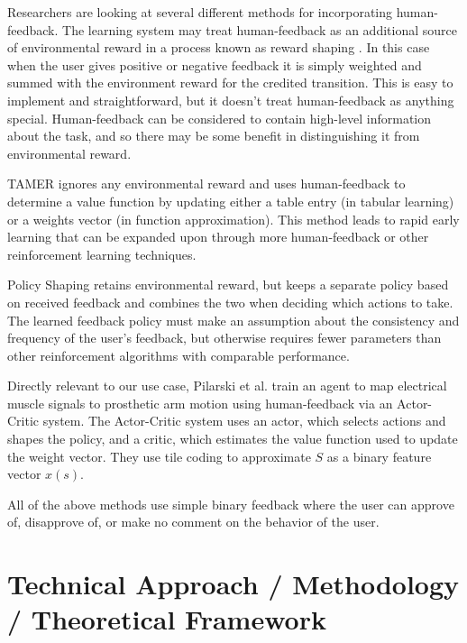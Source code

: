 \documentclass{article}
\begin{document}
Researchers are looking at several different methods for incorporating human-feedback. The learning system may treat human-feedback as an additional source of environmental reward in a process known as reward shaping \cite{ng_policy_1999}. In this case when the user gives positive or negative feedback it is simply weighted and summed with the environment reward for the credited transition. This is easy to implement and straightforward, but it doesn't treat human-feedback as anything special. Human-feedback can be considered to contain high-level information about the task, and so there may be some benefit in distinguishing it from environmental reward.

TAMER \cite{knox_tamer:_2008} ignores any environmental reward and uses human-feedback to determine a value function by updating either a table entry (in tabular learning) or a weights vector (in function approximation). This method leads to rapid early learning that can be expanded upon through more human-feedback or other reinforcement learning techniques.

Policy Shaping \cite{griffith_policy_2013} retains environmental reward, but keeps a separate policy based on received feedback and combines the two when deciding which actions to take. The learned feedback policy must make an assumption about the consistency and frequency of the user's feedback, but otherwise requires fewer parameters than other reinforcement algorithms with comparable performance. 

Directly relevant to our use case, Pilarski et al. \cite{pilarski_online_2011} train an agent to map electrical muscle signals to prosthetic arm motion using human-feedback via an Actor-Critic system. The Actor-Critic system uses an actor, which selects actions and shapes the policy, and a critic, which estimates the value function used to update the weight vector. They use tile coding to approximate $S$ as a binary feature vector $x(s)$. 

All of the above methods use simple binary feedback where the user can approve of, disapprove of, or make no comment on the behavior of the user. 

\section{Technical Approach / Methodology / Theoretical Framework}

\end{document}
